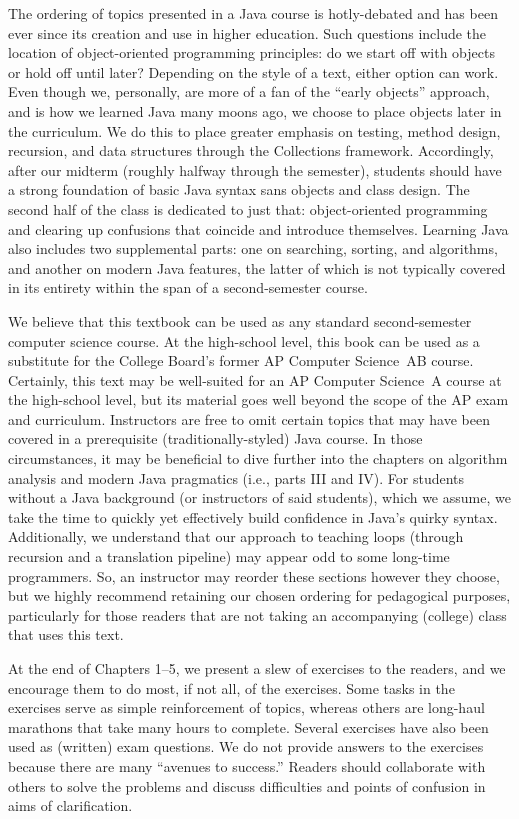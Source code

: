 The ordering of topics presented in a Java course is hotly-debated and has been ever since its creation and use in higher education. 
Such questions include the location of object-oriented programming principles: do we start off with objects or hold off until later? 
Depending on the style of a text, either option can work. 
Even though we, personally, are more of a fan of the ``early objects'' approach, and is how we learned Java many moons ago, we choose to place objects later in the curriculum. 
We do this to place greater emphasis on testing, method design, recursion, and data structures through the Collections framework. 
Accordingly, after our midterm (roughly halfway through the semester), students should have a strong foundation of basic Java syntax sans objects and class design. 
The second half of the class is dedicated to just that: object-oriented programming and clearing up confusions that coincide and introduce themselves. 
Learning Java also includes two supplemental parts: one on searching, sorting, and algorithms, and another on modern Java features, the latter of which is not typically covered in its entirety within the span of a second-semester course.

We believe that this textbook can be used as any standard second-semester computer science course. 
At the high-school level, this book can be used as a substitute for the College Board's former AP Computer Science~AB course. 
Certainly, this text may be well-suited for an AP Computer Science~A course at the high-school level, but its material goes well beyond the scope of the AP exam and curriculum.
Instructors are free to omit certain topics that may have been covered in a prerequisite (traditionally-styled) Java course. 
In those circumstances, it may be beneficial to dive further into the chapters on algorithm analysis and modern Java pragmatics (i.e., parts III and IV). 
For students without a Java background (or instructors of said students), which we assume, we take the time to quickly yet effectively build confidence in Java's quirky syntax. 
Additionally, we understand that our approach to teaching loops (through recursion and a translation pipeline) may appear odd to some long-time programmers. 
So, an instructor may reorder these sections however they choose, but we highly recommend retaining our chosen ordering for pedagogical purposes, particularly for those readers that are not taking an accompanying (college) class that uses this text. 

At the end of Chapters 1--5, we present a slew of exercises to the readers, and we encourage them to do most, if not all, of the exercises.
Some tasks in the exercises serve as simple reinforcement of topics, whereas others are long-haul marathons that take many hours to complete. 
Several exercises have also been used as (written) exam questions.
We do not provide answers to the exercises because there are many ``avenues to success.''
Readers should collaborate with others to solve the problems and discuss difficulties and points of confusion in aims of clarification.

